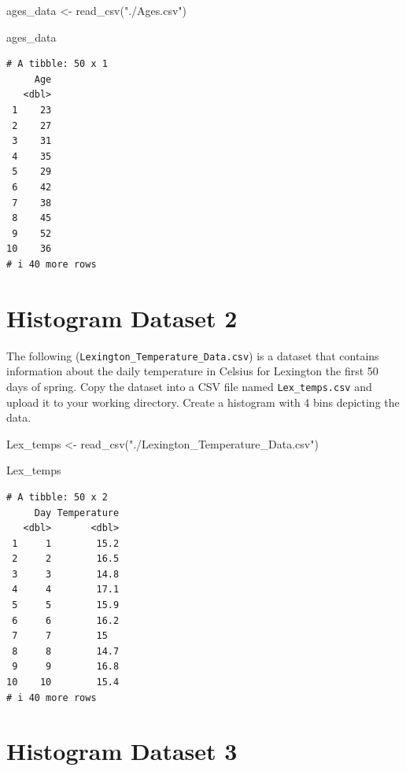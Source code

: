 \documentclass[
  letterpaper,
  DIV=11,
  numbers=noendperiod]{scrreprt}
\newenvironment{Shaded}{\begin{snugshade}}{\end{snugshade}}
\newcommand{\FunctionTok}[1]{\textcolor[rgb]{0.28,0.35,0.67}{#1}}
\newcommand{\NormalTok}[1]{\textcolor[rgb]{0.00,0.23,0.31}{#1}}
\newcommand{\OtherTok}[1]{\textcolor[rgb]{0.00,0.23,0.31}{#1}}
\newcommand{\StringTok}[1]{\textcolor[rgb]{0.13,0.47,0.30}{#1}}
\begin{document}
\begin{Shaded}
\begin{Highlighting}[]
\NormalTok{ages\_data }\OtherTok{\textless{}{-}} \FunctionTok{read\_csv}\NormalTok{(}\StringTok{"./Ages.csv"}\NormalTok{)}

\NormalTok{ages\_data}
\end{Highlighting}
\end{Shaded}

\begin{verbatim}
# A tibble: 50 x 1
     Age
   <dbl>
 1    23
 2    27
 3    31
 4    35
 5    29
 6    42
 7    38
 8    45
 9    52
10    36
# i 40 more rows
\end{verbatim}

\section*{Histogram Dataset 2}\label{histogram-dataset-2}


The following (\texttt{Lexington\_Temperature\_Data.csv}) is a dataset
that contains information about the daily temperature in Celsius for
Lexington the first 50 days of spring. Copy the dataset into a CSV file
named \texttt{Lex\_temps.csv} and upload it to your working directory.
Create a histogram with 4 bins depicting the data.

\begin{Shaded}
\begin{Highlighting}[]
\NormalTok{Lex\_temps }\OtherTok{\textless{}{-}} \FunctionTok{read\_csv}\NormalTok{(}\StringTok{"./Lexington\_Temperature\_Data.csv"}\NormalTok{)}

\NormalTok{Lex\_temps}
\end{Highlighting}
\end{Shaded}

\begin{verbatim}
# A tibble: 50 x 2
     Day Temperature
   <dbl>       <dbl>
 1     1        15.2
 2     2        16.5
 3     3        14.8
 4     4        17.1
 5     5        15.9
 6     6        16.2
 7     7        15  
 8     8        14.7
 9     9        16.8
10    10        15.4
# i 40 more rows
\end{verbatim}

\section*{Histogram Dataset 3}\label{histogram-dataset-3}
\end{document}
